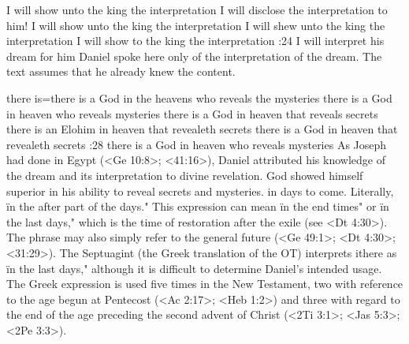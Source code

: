     {I will show unto the king the interpretation} %
    {I will disclose the interpretation to him!} %
    {I will show unto the king the interpretation} %
    {I will shew unto the king the interpretation} %
    {I will show to the king the interpretation} %
:24 {I will interpret his dream for him} Daniel spoke here only 
of the interpretation of the dream. The text assumes that he already 
knew the content.


    {there is}={there is a God in the heavens who reveals the mysteries} %
    {there is a God in heaven who reveals mysteries} %
    {there is a God in heaven that reveals secrets} %
    {there is an Elohim in heaven that revealeth secrets} %
    {there is a God in heaven that revealeth secrets} %
:28 {there is a God in heaven who reveals mysteries} As Joseph had done in Egypt
(<Ge 10:8>; <41:16>), %
Daniel attributed his  
knowledge of the dream and its interpretation to divine revelation. 
God showed himself superior in his ability to reveal secrets and 
mysteries. in days to come. Literally, \"in the after part of the days." 
This expression can mean \"in the end times" or \"in the last days,"
which is the time of restoration after the exile (see <Dt 4:30>). The 
phrase may also simply refer to the general future (<Ge 49:1>; <Dt 4:30>; 
<31:29>). The Septuagint (the Greek translation of the OT) interprets 
ithere as \"in the last days," although it is difficult to determine Daniel's intended usage. The
Greek expression is used five times in the  
New Testament, two with reference to the age begun at Pentecost 
(<Ac 2:17>; <Heb 1:2>) and three with regard to the end of the age preceding the second advent of Christ
(<2Ti 3:1>; <Jas 5:3>; <2Pe 3:3>).

